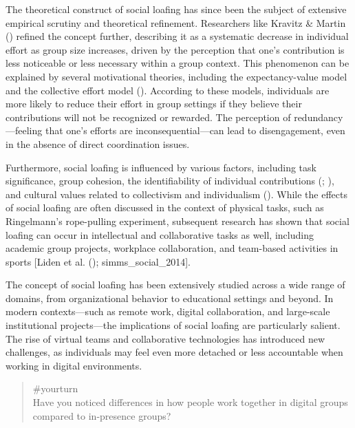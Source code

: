 \documentclass[
  letterpaper,
]{book}
\begin{document}
The theoretical construct of social loafing has since been the subject
of extensive empirical scrutiny and theoretical refinement. Researchers
like Kravitz \& Martin ()
refined the concept further, describing it as a systematic decrease in
individual effort as group size increases, driven by the perception that
one's contribution is less noticeable or less necessary within a group
context. This phenomenon can be explained by several motivational
theories, including the expectancy-value model and the collective effort
model ().
According to these models, individuals are more likely to reduce their
effort in group settings if they believe their contributions will not be
recognized or rewarded. The perception of redundancy---feeling that
one's efforts are inconsequential---can lead to disengagement, even in
the absence of direct coordination issues.

Furthermore, social loafing is influenced by various factors, including
task significance, group cohesion, the identifiability of individual
contributions (;
),
and cultural values related to collectivism and individualism
(). While the effects of
social loafing are often discussed in the context of physical tasks,
such as Ringelmann's rope-pulling experiment, subsequent research has
shown that social loafing can occur in intellectual and collaborative
tasks as well, including academic group projects, workplace
collaboration, and team-based activities in sports {[}Liden et al.
(); simms\_social\_2014{]}.

The concept of social loafing has been extensively studied across a wide
range of domains, from organizational behavior to educational settings
and beyond. In modern contexts---such as remote work, digital
collaboration, and large-scale institutional projects---the implications
of social loafing are particularly salient. The rise of virtual teams
and collaborative technologies has introduced new challenges, as
individuals may feel even more detached or less accountable when working
in digital environments.

\begin{quote}
{\#yourturn}\\
Have you noticed differences in how people work together in digital
groups compared to in-presence groups?
\end{quote}
\end{document}

